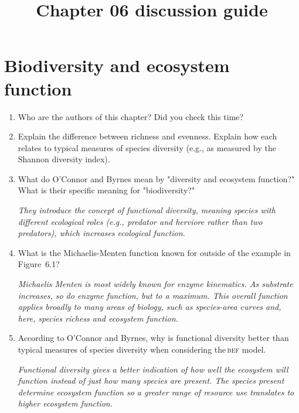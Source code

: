 \documentclass[letterpaper]{tufte-handout}
\title{Chapter 06 discussion guide}
\date{} %
\begin{document}
\maketitle	%

\section*{Biodiversity and ecosystem function}

\begin{enumerate}

	\item Who are the authors of this chapter? Did you check this time?%
	
	\item Explain the difference between richness and evenness. Explain how each relates to typical measures of species diversity (e.g., as measured by the Shannon diversity index).
	
	\item What do O'Connor and Byrnes mean by "diversity and ecosystem function?" What is their specific meaning for "biodiversity?"
	
	\textit{They introduce the concept of functional diversity, meaning species with different ecological roles (e.g., predator and herviore rather than two predators), which increases ecological function.}
		
	\item What is the Michaelis-Menten function known for outside of the example in Figure~6.1?

	\textit{Michaelis Menten is most widely known for enzyme kinematics. As substrate increases, so do enzyme function, but to a maximum. This overall function applies broadly to many areas of biology, such as species-area curves and, here, species richess and ecosystem function.}
	
	\item According to O'Connor and Byrnes, why is functional diversity better than typical measures of species diversity when considering the\,\textsc{bef} model.
	
	\textit{Functional diversity gives a better indication of how well the ecosystem will function instead of just how many species are present. The species present determine ecosystem function so a greater range of resource use translates to higher ecosystem function.}
	

\end{enumerate}
\end{document}
